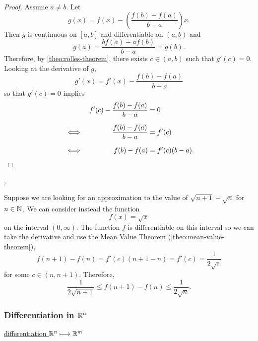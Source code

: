 \documentclass[../MathsNotesBase.tex]{subfiles}
\begin{document}
{\begin{proof}
			Assume ${ a \neq b }$. Let
			\[ g(x) = f(x) - \left( \frac{f(b) - f(a)}{b - a} \right) x. \]
			Then $g$ is continuous on ${ [a,b] }$ and differentiable on ${ (a,b) }$ and
			\[ g(a) = \frac{b f(a) - a f(b)}{b - a} = g(b). \]
			Therefore, by \autoref{theo:rolles-theorem}, there exists ${ c \in (a,b) }$ such that ${ g'(c) = 0 }$.\\
			
			Looking at the derivative of $g$,
			\[ g'(x) = f'(x) - \frac{f(b) - f(a)}{b - a} \]
			so that ${ g'(c) = 0 }$ implies
			\[\begin{aligned}
				&& f'(c) - \frac{f(b) - f(a)}{b - a} &= 0 \nn
				&\iff & \frac{f(b) - f(a)}{b - a} &= f'(c) \nn
				&\iff & f(b) - f(a) &= f'(c)(b - a).  \qedhere
			\end{aligned}\]
		\end{proof}
	
		
		\biggerskip
		\sep
		\begin{exe}
			\ex Suppose we are looking for an approximation to the value of ${ \sqrt{n + 1} - \sqrt{n} }$ for ${ n \in \mathbb{N}^{} }$. We can consider instead the function
			\[ f(x) = \sqrt{x} \]
			on the interval ${ (0,\infty) }$. The function $f$ is differentiable on this interval so we can take the derivative and use the Mean Value Theorem (\autoref{theo:mean-value-theorem}),
			\[ f(n + 1) - f(n) = f'(c)(n + 1 - n) = f'(c) = \frac{1}{2\sqrt{c}} \]
			for some ${ c \in (n, n+1) }$. Therefore,
			\[ \frac{1}{2\sqrt{n+1}} \leq f(n + 1) - f(n) \leq \frac{1}{2\sqrt{n}}. \]
		\end{exe}
	
	
	
		
		\nl[12]
		\subsubsection{Differentiation in \texorpdfstring{$\mathbb{R}^{n}$}{Rn}}
		{\tiny 
			\hyperref[ssssection:differentiation-Rn-Rm]{differentiation $\mathbb{R}^{n} \longmapsto \mathbb{R}^{m}$} \hspace{20pt} \hyperref[]{}\\
		}
		\biggerskip
		
		\nl[4]
		}
\end{document}
